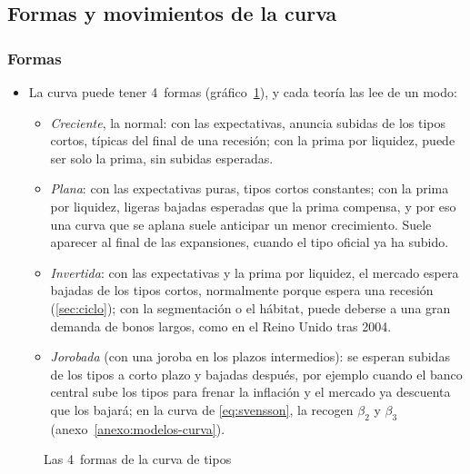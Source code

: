 \documentclass[11pt]{article}
\begin{document}
\subsection{Formas y movimientos de la curva}\label{sec:formas}

\subsubsection{Formas}\label{sec:formas-curva}

\begin{itemize}
\item La curva puede tener 4~formas (gráfico~\ref{fig:formas-curva}), y cada teoría las lee de un modo\nocite{BodieKaneMarcus2021Investments}:
  \begin{itemize}
  \item \emph{Creciente}, la normal: con las expectativas, anuncia subidas de los tipos cortos, típicas del final de una recesión; con la prima por liquidez, puede ser solo la prima, sin subidas esperadas.
  \item \emph{Plana}: con las expectativas puras, tipos cortos constantes; con la prima por liquidez, ligeras bajadas esperadas que la prima compensa, y por eso una curva que se aplana suele anticipar un menor crecimiento. Suele aparecer al final de las expansiones, cuando el tipo oficial ya ha subido.
  \item \emph{Invertida}: con las expectativas y la prima por liquidez, el mercado espera bajadas de los tipos cortos, normalmente porque espera una recesión (\ref{sec:ciclo}); con la segmentación o el hábitat, puede deberse a una gran demanda de bonos largos, como en el Reino Unido tras 2004.
  \item \emph{Jorobada} (con una joroba en los plazos intermedios): se esperan subidas de los tipos a corto plazo y bajadas después, por ejemplo cuando el banco central sube los tipos para frenar la inflación y el mercado ya descuenta que los bajará; en la curva de  \eqref{eq:svensson}, la recogen $\beta_2$ y $\beta_3$ (anexo~\ref{anexo:modelos-curva}).
  \end{itemize}
\end{itemize}

\begin{figure}[H]
\centering
\caption{Las 4~formas de la curva de tipos}\label{fig:formas-curva}
\end{figure}
\end{document}
